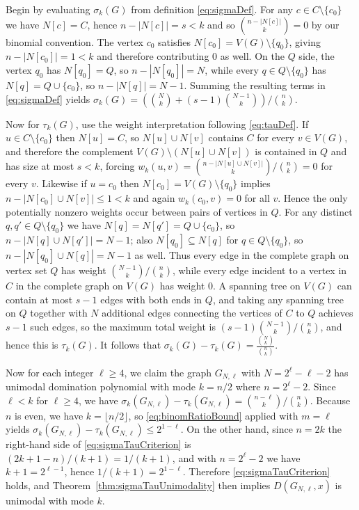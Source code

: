 \documentclass[11pt]{amsart}
\numberwithin{equation}{section}
\newcommand{\VV}{V(G)}
\begin{document}

Begin by evaluating $\sigma_k(G)$ from definition \eqref{eq:sigmaDef}. For any $c\in C\setminus\{c_0\}$ we have $N[c]=C$, hence $n-|N[c]|=s<k$ and so $\binom{n-|N[c]|}{k}=0$ by our binomial convention. The vertex $c_0$ satisfies $N[c_0]=\VV\setminus\{q_0\}$, giving $n-|N[c_0]|=1<k$ and therefore contributing $0$ as well. On the $Q$ side, the vertex $q_0$ has $N[q_0]=Q$, so $n-|N[q_0]|=N$, while every $q\in Q\setminus\{q_0\}$ has $N[q]=Q\cup\{c_0\}$, so $n-|N[q]|=N-1$. Summing the resulting terms in \eqref{eq:sigmaDef} yields $\sigma_k(G)=\left(\binom{N}{k}+(s-1)\binom{N-1}{k}\right)/\binom{n}{k}$.

Now for $\tau_k(G)$, use the weight interpretation following \eqref{eq:tauDef}. If $u\in C\setminus\{c_0\}$ then $N[u]=C$, so $N[u]\cup N[v]$ contains $C$ for every $v\in\VV$, and therefore the complement $\VV\setminus(N[u]\cup N[v])$ is contained in $Q$ and has size at most $s<k$, forcing $w_k(u,v)=\binom{n-|N[u]\cup N[v]|}{k}/\binom{n}{k}=0$ for every $v$. Likewise if $u=c_0$ then $N[c_0]=\VV\setminus\{q_0\}$ implies $n-|N[c_0]\cup N[v]|\le 1<k$ and again $w_k(c_0,v)=0$ for all $v$. Hence the only potentially nonzero weights occur between pairs of vertices in $Q$. For any distinct $q,q'\in Q\setminus\{q_0\}$ we have $N[q]=N[q']=Q\cup\{c_0\}$, so $n-|N[q]\cup N[q']|=N-1$; also $N[q_0]\subseteq N[q]$ for $q\in Q\setminus\{q_0\}$, so $n-|N[q_0]\cup N[q]|=N-1$ as well. Thus every edge in the complete graph on vertex set $Q$ has weight $\binom{N-1}{k}/\binom{n}{k}$, while every edge incident to a vertex in $C$ in the complete graph on $\VV$ has weight $0$. A spanning tree on $\VV$ can contain at most $s-1$ edges with both ends in $Q$, and taking any spanning tree on $Q$ together with $N$ additional edges connecting the vertices of $C$ to $Q$ achieves $s-1$ such edges, so the maximum total weight is $(s-1)\binom{N-1}{k}/\binom{n}{k}$, and hence this is $\tau_k(G)$. It follows that $\sigma_k(G)-\tau_k(G)=\frac{\binom{N}{k}}{\binom{n}{k}}.$

Now for each integer $\ell\ge 4$, we claim the graph $G_{N,\ell}$ with $N=2^\ell-\ell-2$ has unimodal domination polynomial with mode $k=n/2$ where $n=2^{\ell}-2$. Since $\ell<k$ for $\ell\ge 4$, we have $\sigma_k(G_{N,\ell})-\tau_k(G_{N,\ell})=\binom{n-\ell}{k}/\binom{n}{k}$. Because $n$ is even, we have $k=\lfloor n/2\rfloor$, so \eqref{eq:binomRatioBound} applied with $m=\ell$ yields $\sigma_k(G_{N,\ell})-\tau_k(G_{N,\ell})\le 2^{1-\ell}$. On the other hand, since $n=2k$ the right-hand side of \eqref{eq:sigmaTauCriterion} is $(2k+1-n)/(k+1)=1/(k+1)$, and with $n=2^\ell-2$ we have $k+1=2^{\ell-1}$, hence $1/(k+1)=2^{1-\ell}$. Therefore \eqref{eq:sigmaTauCriterion} holds, and Theorem~\ref{thm:sigmaTauUnimodality} then implies $D(G_{N,\ell},x)$ is unimodal with mode $k$.
\end{document}
